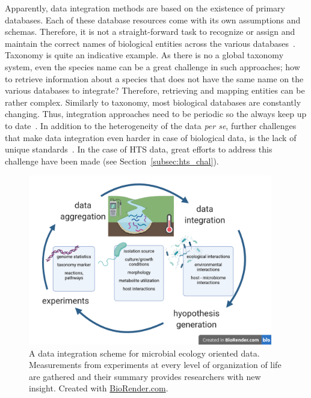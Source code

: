       Apparently, data integration methods are based on the existence of primary databases. 
      Each of these database resources come with its own assumptions and schemas. 
      Therefore, it is not a straight-forward task to recognize or assign and maintain 
      the correct names of biological entities across the various databases~\citep{stein2003integrating}.
      Taxonomy is quite an indicative example. 
      As there is no a global taxonomy system, even the species name can be a 
      great challenge in such approaches; how to retrieve information about a species
      that does not have the same name on the various databases to integrate? 
      Therefore, retrieving and mapping entities can be rather complex.  
      Similarly to taxonomy, most biological databases are constantly changing. 
      Thus, integration approaches need to be periodic so the always keep up to date~\citep{stein2003integrating}.
      In addition to the heterogeneity of the data \textit{per se},
      further challenges that make data integration even harder in case of biological data,
      is the lack of unique standards~\citep{triplet2011systems}.
      In the case of HTS data, great efforts to address this challenge have been 
      made (see Section~\ref{subsec:hts_chal}).

      \begin{figure}[!h]
         \centering
         \includegraphics[width=0.95\textwidth]{figures/data_integration_scheme.png}
         \caption[Data integration in Microbial Ecology]{A data integration scheme for microbial ecology oriented data. 
         Measurements from experiments at every level of organization of life are gathered and their summary provides researchers with new insight. Created with \href{BioRender.com}{BioRender.com}.
         }
         \label{fig:data_int}
      \end{figure}


